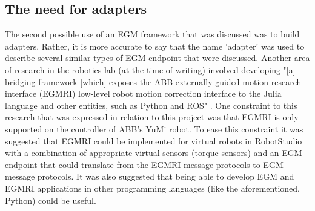 \documentclass{cslthse-msc}
\begin{document}
\subsection{The need for adapters}
\label{sec:Dev:I2:adapters}
The second possible use of an EGM framework that was discussed was to build adapters. Rather, it is more accurate to say that the name 'adapter' was used to describe several similar types of EGM endpoint that were discussed. Another area of research in the robotics lab (at the time of writing) involved developing "[a] bridging framework [which] exposes the ABB externally guided motion research interface (EGMRI) low-level robot motion correction interface to the Julia language and other entities, such as Python and ROS" \cite{LU:egmri}. One constraint to this research that was expressed in relation to this project was that EGMRI is only supported on the controller of ABB's YuMi robot. To ease this constraint it was suggested that EGMRI could be implemented for virtual robots in RobotStudio with a combination of appropriate virtual sensors (torque sensors) and an EGM endpoint that could translate from the EGMRI message protocols to EGM message protocols. It was also suggested that being able to develop EGM and EGMRI applications in other programming languages (like the aforementioned, Python) could be useful.  
\end{document}

